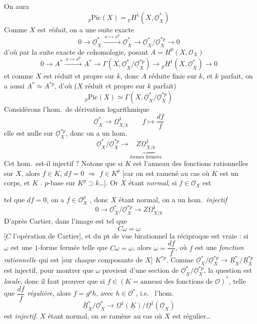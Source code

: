 \documentclass[11pt,a4paper]{article}
\begin{document}
On aura
\[
  {}_p\mathrm{Pic}(X) = {}_pH^1(X, \underline{\mathcal{O}}_X^{*})
\]
Comme $X$ est \emph{réduit}, on a une suite exacte
\[
  0 \to \underline{\mathcal{O}}_X^{*} \xrightarrow{\ x \mapsto x^p\ }
  \underline{\mathcal{O}}_X^{*} \to
  \underline{\mathcal{O}}_X^{*} / \underline{\mathcal{O}}_X^{*p} \to 0
\]
d'où par la suite exacte de cohomologie, posant $A = H^0(X, \mathcal{O}_X)$
\[
  0 \to A^{*} \xrightarrow{\ x \mapsto x^p\ } A^{*} \to
  \Gamma(X, \underline{\mathcal{O}}_X^{*}/\underline{\mathcal{O}}_X^{*p})
  \to {}_pH^1(X, \underline{\mathcal{O}}_X^{*}) \to 0
\]
et comme $X$ est réduit et propre sur $k$, donc $A$ réduite finie
 sur $k$, et $k$ parfait, on a aussi
$A^{*} \simeq A^{*p}$, d'où ($X$ réduit et propre sur $k$ parfait)
\[
  {}_p\mathrm{Pic}(X) \simeq
  \Gamma(X, \underline{\mathcal{O}}_X^{*}/\underline{\mathcal{O}}_X^{*p})
\]
Considérons l'hom.\ de dérivation logarithmique
\[
  \underline{\mathcal{O}}_X^{*} \longrightarrow \underline{\Omega}^1_{X/k}
  \qquad f \longmapsto \frac{df}{f}
\]
elle est nulle sur $\underline{\mathcal{O}}_X^{*p}$, donc on a un hom.
\[
  \underline{\mathcal{O}}_X^{*}/\underline{\mathcal{O}}_X^{*p}
  \longrightarrow \underbrace{Z\underline{\Omega}^1_{X/k}}_{\text{formes fermées}}
\]
Cet hom.\ est-il injectif ? Notons que si $K$ est l'anneau des fonctions
rationnelles sur $X$, alors $f \in K$, $df = 0$ $\Longrightarrow$
$f \in K^p$ [car  on est ramené au cas où $K$ est un
corps, et $K$ \struck{\ill{} \ill{}}. \ill{} \ill{} $p$-base sur
$K^p \supset k$\ldots]. Or $X$ étant \emph{normal}, si
$f \in \mathcal{O}_X$ est


tel que $df = 0$,  on a $f \in \mathcal{O}_X^{p}$
, donc $X$ étant
normal, on a un hom.\ \emph{injectif}
\[
  0 \to \underline{\mathcal{O}}_X^{*}/\underline{\mathcal{O}}_X^{*p}
  \longrightarrow Z\underline{\Omega}^1_{X/k}
\]
D'après Cartier,  dans l'image est tel
que
\[
  C\omega = \omega
\]
[$C$ l'opération de Cartier], et du pt de vue birationnel la réciproque est
vraie : si $\omega$ est une $1$-forme fermée telle que $C\omega = \omega$,
alors $\omega = \dfrac{df}{f}$, où $f$ est une \emph{fonction rationnelle}
qui est   [sur chaque
composante de $X$] $K^{*p}$. Comme
$\underline{\mathcal{O}}_X^{*}/\underline{\mathcal{O}}_X^{*p} \to
\underline{R}_X^{*}/\underline{R}_X^{*p}$ est injectif, pour montrer que
$\omega$ provient d'une section de
$\underline{\mathcal{O}}_X^{*}/\underline{\mathcal{O}}_X^{*p}$, la question
est \emph{locale}, donc il faut prouver que si
$f \in (K = \text{anneau des fonctions de } \mathcal{O})^{*}$, telle que
$\dfrac{df}{f}$ \emph{régulière}, alors $f = g^p h$, avec
$h \in \mathcal{O}^{*}$, i.e.\  l'hom.
\[
  \underline{R}_X^{*}/\underline{\mathcal{O}}_X^{*} \longrightarrow
  \underline{\Omega}^1(\underline{K})/\underline{\Omega}^1(\underline{\mathcal{O}}_X)
\]
est \emph{injectif}. $X$ étant normal, \struck{\ill{} \ill{} \ill{}} on se
ramène au cas où $X$ est \struck{\ill{}} régulier\ldots
{}
\end{document}
